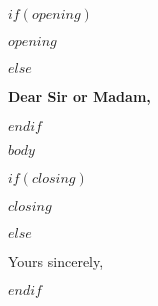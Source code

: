 \documentclass{letter}
\date{$date$}
\begin{document}
\begin{letter}{} %

$if(opening)$
\opening{\textbf{$opening$}}
$else$
\opening{\textbf{Dear Sir or Madam,}}
$endif$

$body$

\vspace{2\parskip} %
$if(closing)$
\closing{$closing$}
$else$
\closing{Yours sincerely,}
$endif$
\vspace{2\parskip} %

\end{letter}
\end{document}
